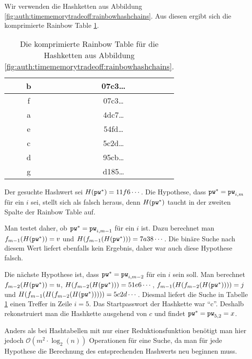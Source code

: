 \begin{beispiel}
	Wir verwenden die Hashketten aus Abbildung \ref{fig:auth:timememorytradeoff:rainbowhashchains}. Aus diesen ergibt sich die komprimierte Rainbow Table \ref{table:auth:rainbowtable}.
	
\begin{table}[h]
	\begin{center}
		\begin{tabular}{|c|c|}
			\hline
			b & 07c3\ldots\\\hline
			f & 07c3\ldots\\\hline
			a & 4dc7\ldots\\\hline
			e & 54fd\ldots\\\hline
			c & 5c2d\ldots\\\hline
			d & 95cb\ldots\\\hline
			g & d185\ldots\\\hline
		\end{tabular}
	\end{center}
	\caption{Die komprimierte Rainbow Table für die Hashketten aus Abbildung \ref{fig:auth:timememorytradeoff:rainbowhashchains}.}
	\label{table:auth:rainbowtable}
\end{table}

	Der gesuchte Hashwert sei $H(\texttt{pw}^*) = 11f6\cdots$.
	Die Hypothese, dass $\texttt{pw}^* = \texttt{pw}_{i,m}$ für ein $i$ sei, stellt sich als falsch heraus, denn $H(\texttt{pw}^*)$ taucht in der zweiten Spalte der Rainbow Table auf.
	
	Man testet daher, ob $\texttt{pw}^* = \texttt{pw}_{i,m-1}$ für ein $i$ ist. Dazu berechnet man $f_{m-1}(H(\texttt{pw}^*)) = v$ und $H(f_{m-1}(H(\texttt{pw}^*))) = 7a38\cdots$. Die binäre Suche nach diesem Wert liefert ebenfalls kein Ergebnis, daher war auch diese Hypothese falsch.
	
	Die nächste Hypothese ist, dass $\texttt{pw}^* = \texttt{pw}_{i,m-2}$ für ein $i$ sein soll.
	Man berechnet $f_{m-2}(H(\texttt{pw}^*)) = u$, $H(f_{m-2}(H(\texttt{pw}^*))) = 51e6\cdots$, $f_{m-1}(H(f_{m-2}(H(\texttt{pw}^*)))) = j$ und $H(f_{m-1}(H(f_{m-2}(H(\texttt{pw}^*))))) = 5c2d\cdots$. Diesmal liefert die Suche in Tabelle \ref{table:auth:rainbowtable} einen Treffer in Zeile $i = 5$. Das Startpasswort der Hashkette war "`c"'. Deshalb rekonstruiert man die Hashkette ausgehend von $c$ und findet $\texttt{pw}^* = \texttt{pw}_{5,2} = x$.\\
\end{beispiel}

Anders als bei Hashtabellen mit nur einer Reduktionsfunktion benötigt man hier jedoch $\mathcal{O}(m^2 \cdot \log_2(n))$ Operationen für eine Suche, da man für jede Hypothese die Berechnung des entsprechenden Hashwerts neu beginnen muss.

